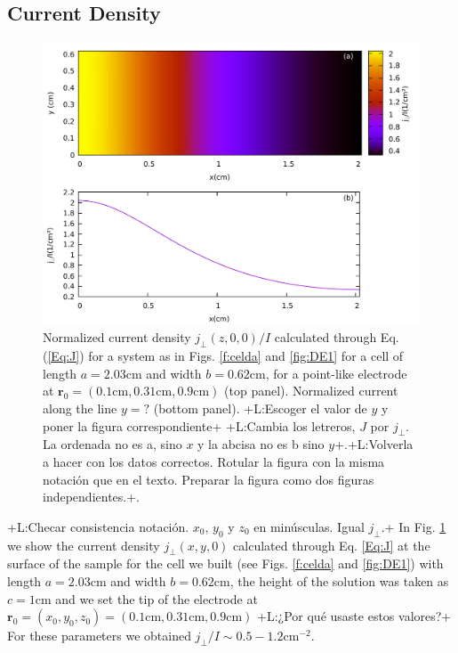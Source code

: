 \documentclass{article}
\newcommand{\notaL}[1]{{\color{blue}+L:#1+}}
\begin{document}
\subsection{Current Density}
\label{sec:current-density}
\begin{figure}
  \centering
  \includegraphics[width=\textwidth]{Images/G123}
  \caption{Normalized current density $j_\perp(z,0,0)/I$ calculated through
    Eq. (\ref{Eq:J}) for a
    system as in Figs. \ref{f:celda} and \ref{fig:DE1} for a cell of
    length $a = 2.03\text{cm}$ and width $b=0.62\text{cm}$, for a
    point-like electrode at $\bm r_0=(0.1\text{cm},
    0.31\text{cm},0.9\text{cm})$ (top panel). Normalized current
    along the line $y=?$ (bottom panel). \notaL{Escoger el valor de
      $y$ y poner la figura correspondiente} \notaL{Cambia los letreros, $J$ por
      $j_\perp$. La ordenada no es a, sino $x$ y la abcisa no es b
      sino $y$}.\notaL{Volverla a hacer con los datos
      correctos. Rotular la figura con la misma notación que en el
      texto. Preparar la figura como dos figuras independientes.}. }
  \label{fig:DR1}
\end{figure}
\notaL{Checar consistencia notación. $x_0$, $y_0$ y $z_0$ en
  minúsculas. Igual $j_\perp$.}
In Fig. \ref{fig:DR1} we show the current density $j_\perp(x,y,0)$ calculated through
Eq. \eqref{Eq:J} at the surface of the sample for the cell we built
(see Figs. \ref{f:celda} and \ref{fig:DE1}) with length
$a=2.03\text{cm}$ and width $b = 0.62\text{cm}$, the height of the
solution was taken as $c=1\text{cm}$ and we set the tip of the
electrode at $\bm
r_0=(x_0,y_0,z_0)=(0.1\text{cm},0.31\text{cm},0.9\text{cm})$
\notaL{¿Por qué usaste estos valores?}
For these parameters we obtained $ j_\perp/I\sim
0.5-1.2\text{cm}^{-2}$.
\end{document}

